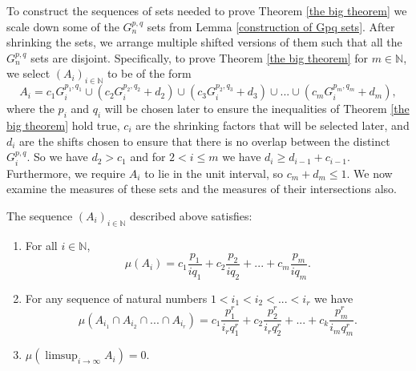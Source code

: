 \documentclass[12pt]{article}
\begin{document}
To construct the sequences of sets needed to prove Theorem \ref{the big theorem} we scale down some of the \(G_{n}^{p,q}\) sets from Lemma \ref{construction of Gpq sets}. After shrinking the sets, we arrange multiple shifted versions of them such that all the \(G_{n}^{p,q}\) sets are disjoint. Specifically, to prove Theorem \ref{the big theorem} for $m \in \mathbb{N}$, we select $(A_i)_{i \in \mathbb{N}}$ to be of the form
\[A_i= c_1 G_{i}^{p_1,q_1} \cup ( c_2 G_{i}^{p_2,q_2}+d_2 ) \cup (c_3 G_{i}^{p_2,q_3}+d_3)  \cup ... \cup (c_m G_{i}^{p_m,q_m}+d_m), \]
where the $p_i$ and $q_i$ will be chosen later to ensure the inequalities of Theorem \ref{the big theorem} hold true, $c_i$ are the shrinking factors that will be selected later, and $d_i$ are the shifts chosen to ensure that there is no overlap between the distinct $G_i^{p,q}$. So we have $d_2>c_1$ and for $2 < i \leq m$ we have $d_i \geq d_{i-1} +c_{i-1}$. Furthermore, we require $A_i$ to lie in the unit interval, so $c_m+d_m \leq 1$. 
We now examine the measures of these sets and the measures of their intersections also.

\begin{lemma}\label{Ai lemma}
    The sequence $(A_i)_{i \in \mathbb{N}}$ described above satisfies: 
    \begin{enumerate}[label=(\roman*)]
    \item For all $i \in \mathbb{N}$,
    \[ \mu(A_i) = c_1 \frac{p_1}{i q_1} + c_2 \frac{p_2}{i q_2} + ... + c_m \frac{p_m}{i q_m}.\]
     \item For any sequence of natural numbers $1<i_1<i_2<...<i_r$ we have
     \[\mu(A_{i_1} \cap A_{i_2} \cap ... \cap A_{i_r}) =  c_1 \frac{p_1^r}{i_r q_1^r} + c_2 \frac{p_2^r}{i_r q_2^r} + ... + c_k  \frac{p_m^r}{i_m q_m^r}.\]
     \item $\mu(\limsup_{i \rightarrow \infty} A_i) =0$.
    \end{enumerate}

\end{lemma}
\end{document}

